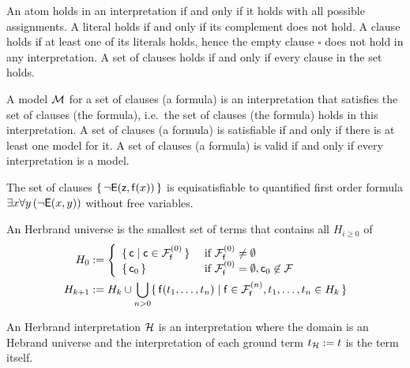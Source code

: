 \begin{definition}\label{def:semantics:CNF}
	An atom holds in an interpretation if and only if it 
	holds with all possible assignments. 
	A literal holds if and only if its complement does not hold.
	A clause holds if at least one of its literals holds,
	hence the empty clause $\square$ does not hold in any interpretation.
	A set of clauses holds if and only if every clause in the set holds.
\end{definition}

\begin{definition}
	A {\myem model} ${\mathcal M}$ for a set of clauses (a formula) is an interpretation that 
	{\myem satisfies} the set of clauses (the formula),
	i.e.~the set of clauses (the formula) holds in this interpretation.
	A set of clauses (a formula) is {\myem satisfiable} if and only if there is at least one model for it. 
	A set of clauses (a formula) is {\myem valid} if and only if every interpretation is a model.
\end{definition}

\begin{example}
	The set of clauses $\{\,\lnot{\mathsf{E}}({\mathsf z}, {\mathsf f}(x))\,\}$ is equisatisfiable to quantified first order formula $\exists x \forall y\,(\lnot {\mathsf{E}}(x,y))$ without free variables.
\end{example}

\begin{definition}\label{def:hk}
	An {\myem Herbrand universe} is the smallest set of terms that contains all $H_{i\geq 0}$ of
	\begin{align*}
	H_0 &:= \left\{ 
	\begin{array}{ll}
	\{\,\mc \mid \mc\in\mcFfn[0]\,\} 
	&\text{if } \mcFfn[0]\not=\emptyset\\
	\{\,\mc_0\,\}
	&\text{if } \mcFfn[0]=\emptyset, \mc_0\not\in\mcF
	\end{array}
	\right. 
	\\
	H_{k+1} &:= H_k \cup \bigcup_{n> 0} 
	\{\,  
	\mf(t_1,\ldots,t_n) \mid
	\mf\in\mcFfn[n],
	t_1,\ldots,t_n \in H_k
	\,\}
	\end{align*}
	
\end{definition}

\begin{definition}
	An {\myem Herbrand interpretation} ${\mathcal H}$ is an interpretation where the domain 
	is an Hebrand universe
	and the interpretation of each ground term $t_{\mathcal H} := t$ is the term itself.
\end{definition}

